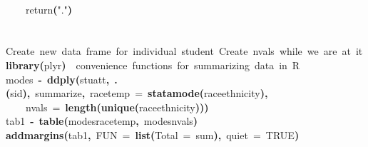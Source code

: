 \documentclass[12pt]{article}
\makeatletter
\newcommand{\hlnumber}[1]{\textcolor[rgb]{0,0,0}{#1}}%
\newcommand{\hlfunctioncall}[1]{\textcolor[rgb]{0.501960784313725,0,0.329411764705882}{\textbf{#1}}}%
\newcommand{\hlstring}[1]{\textcolor[rgb]{0.6,0.6,1}{#1}}%
\newcommand{\hlkeyword}[1]{\textcolor[rgb]{0,0,0}{\textbf{#1}}}%
\newcommand{\hlargument}[1]{\textcolor[rgb]{0.690196078431373,0.250980392156863,0.0196078431372549}{#1}}%
\newcommand{\hlcomment}[1]{\textcolor[rgb]{0.180392156862745,0.6,0.341176470588235}{#1}}%
\newcommand{\hlassignement}[1]{\textcolor[rgb]{0,0,0}{\textbf{#1}}}%
\newcommand{\hlsymbol}[1]{\textcolor[rgb]{0,0,0}{#1}}%
\newcommand{\hlstd}[1]{\textcolor[rgb]{0,0,0}{#1}}%
\newenvironment{kframe}{%
 \def\FrameCommand##1{\hskip\@totalleftmargin \hskip-\fboxsep
 \colorbox{shadecolor}{##1}\hskip-\fboxsep
     \hskip-\linewidth \hskip-\@totalleftmargin \hskip\columnwidth}%
 \MakeFramed {\advance\hsize-\width
   \@totalleftmargin\z@ \linewidth\hsize
   \@setminipage}}%
 {\par\unskip\endMakeFramed}
\newenvironment{knitrout}{}{} %
\renewenvironment{knitrout}{\begin{footnotesize}}{\end{footnotesize}}
\makeatother
\begin{document}
\begin{knitrout}
\begin{kframe}
\begin{flushleft}
\hlstd{}{\ }{\ }{\ }{\ }\hlkeyword{\usebox{\hlnormalsizeboxclosebrace}}\hspace*{\fill}\\
\hlstd{}{\ }{\ }{\ }{\ }\hlsymbol{return}\hlfunctioncall{}\hlkeyword{(}\hlstring{"{}."{}}\hlkeyword{)}\hspace*{\fill}\\
\hlstd{}\hlkeyword{\usebox{\hlnormalsizeboxclosebrace}}\hspace*{\fill}\\
\hlstd{}\hspace*{\fill}\\
\hlstd{}\hlcomment{\usebox{\hlnormalsizeboxhash}{\ }Create{\ }new{\ }data{\ }frame{\ }for{\ }individual{\ }student{\ }Create{\ }nvals{\ }while{\ }we{\ }are{\ }at{\ }it}\hspace*{\fill}\\
\hlstd{}\hlfunctioncall{library}\hlkeyword{(}\hlsymbol{plyr}\hlkeyword{)}{\ }{\ }\hlcomment{\usebox{\hlnormalsizeboxhash}{\ }convenience{\ }functions{\ }for{\ }summarizing{\ }data{\ }in{\ }R}\hspace*{\fill}\\
\hlstd{}\hlsymbol{modes}{\ }\hlassignement{\usebox{\hlnormalsizeboxlessthan}-}{\ }\hlfunctioncall{ddply}\hlkeyword{(}\hlsymbol{stuatt}\hlkeyword{,}{\ }\hlfunctioncall{.}\hlkeyword{(}\hlsymbol{sid}\hlkeyword{)}\hlkeyword{,}{\ }\hlsymbol{summarize}\hlkeyword{,}{\ }\hlargument{race\usebox{\hlnormalsizeboxunderscore}temp}{\ }\hlargument{=}{\ }\hlfunctioncall{statamode}\hlkeyword{(}\hlsymbol{race\usebox{\hlnormalsizeboxunderscore}ethnicity}\hlkeyword{)}\hlkeyword{,}\hspace*{\fill}\\
\hlstd{}{\ }{\ }{\ }{\ }\hlargument{nvals}{\ }\hlargument{=}{\ }\hlfunctioncall{length}\hlkeyword{(}\hlfunctioncall{unique}\hlkeyword{(}\hlsymbol{race\usebox{\hlnormalsizeboxunderscore}ethnicity}\hlkeyword{)}\hlkeyword{)}\hlkeyword{)}\hspace*{\fill}\\
\hlstd{}\hlsymbol{tab1}{\ }\hlassignement{\usebox{\hlnormalsizeboxlessthan}-}{\ }\hlfunctioncall{table}\hlkeyword{(}\hlsymbol{modes}\hlkeyword{\usebox{\hlnormalsizeboxdollar}}\hlsymbol{race\usebox{\hlnormalsizeboxunderscore}temp}\hlkeyword{,}{\ }\hlsymbol{modes}\hlkeyword{\usebox{\hlnormalsizeboxdollar}}\hlsymbol{nvals}\hlkeyword{)}\hspace*{\fill}\\
\hlstd{}\hlfunctioncall{addmargins}\hlkeyword{(}\hlsymbol{tab1}\hlkeyword{,}{\ }\hlargument{FUN}{\ }\hlargument{=}{\ }\hlfunctioncall{list}\hlkeyword{(}\hlargument{Total}{\ }\hlargument{=}{\ }\hlsymbol{sum}\hlkeyword{)}\hlkeyword{,}{\ }\hlargument{quiet}{\ }\hlargument{=}{\ }\hlnumber{TRUE}\hlkeyword{)}\mbox{}
\normalfont
\end{flushleft}
\begin{verbatim}
                 

\end{verbatim}
\end{kframe}
\end{knitrout}
\end{document}
